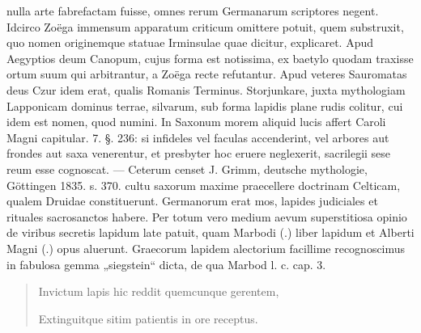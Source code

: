 \documentclass[a4paper, 11pt, oneside, polutonikogreek, german]{article}
\begin{document}
nulla arte fabrefactam fuisse, omnes rerum Germanarum scriptores negent. Idcirco Zoëga immensum apparatum criticum omittere potuit, quem substruxit, quo nomen originemque statuae Irminsulae quae dicitur, explicaret. Apud Aegyptios deum Canopum, cujus forma est notissima, ex baetylo quodam traxisse ortum suum qui arbitrantur, a Zoëga recte refutantur. Apud veteres Sauromatas deus Czur idem erat, qualis Romanis Terminus. Storjunkare, juxta mythologiam Lapponicam dominus terrae, silvarum, sub forma lapidis plane rudis colitur, cui idem est nomen, quod numini. In Saxonum morem aliquid lucis affert Caroli Magni capitular. 7. §. 236: si infideles vel faculas accenderint, vel arbores aut frondes aut saxa venerentur, et presbyter hoc eruere neglexerit, sacrilegii sese reum esse cognoscat. --- Ceterum censet J. Grimm, deutsche mythologie, Göttingen 1835. s. 370. cultu saxorum maxime praecellere doctrinam Celticam, qualem Druidae constituerunt. Germanorum erat mos, lapides judiciales et rituales sacrosanctos habere. Per totum vero medium aevum superstitiosa opinio de viribus secretis lapidum late patuit, quam Marbodi (.) liber lapidum et Alberti Magni (.) opus aluerunt. Graecorum lapidem alectorium facillime recognoscimus in fabulosa gemma „siegstein“ dicta, de qua Marbod l. c. cap. 3.
\begin{quotation}
Invictum lapis hic reddit quemcunque gerentem,

Extinguitque sitim patientis in ore receptus.
\end{quotation}
\end{document}
